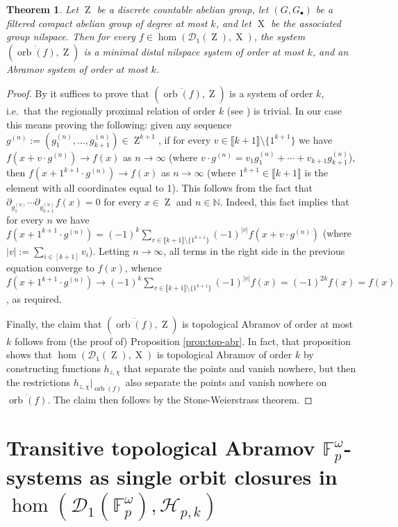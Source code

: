 \documentclass[a4paper,12pt,reqno]{amsart}
\newtheorem{theorem}{Theorem}[section]
\theoremstyle{definition}
\newcommand{\mc}{\mathcal}
\newcommand{\mb}{\mathbb}
\DeclareMathOperator{\ab}{Z}
\DeclareMathOperator{\ns}{X}
\DeclareMathOperator{\orb}{orb}
\newcommand*{\db}[1]{\llbracket #1\rrbracket}
\begin{document}
\begin{theorem}\label{thm:poly-gen-min-dis-ilspace-systems}
Let $\ab$ be a discrete countable abelian group, let $(G,G_\bullet)$ be a filtered compact abelian group of degree at most $k$, and let $\ns$ be the associated group nilspace. Then for every $f\in \hom(\mc{D}_1(\ab),\ns)$, the system $(\overline{\orb(f)},\ab)$ is a minimal distal nilspace system of order at most $k$, and an Abramov system of order at most $k$.
\end{theorem}

\begin{proof}
By \cite[Theorem 7.14]{GGY} it suffices to prove that $(\overline{\orb(f)},\ab)$ is a system of order $k$, i.e.\ that the regionally proximal relation of order $k$ (see \cite{Song-Ye}) is trivial. In our case this means proving the following: given any sequence $g^{(n)}:=(g_1^{(n)},\ldots,g_{k+1}^{(n)}) \in \ab^{k+1}$, if for every $v\in \db{k+1}\setminus\{1^{k+1}\}$ we have $f(x+v\cdot g^{(n)})\to f(x)$ as $n\to \infty$ (where $v\cdot g^{(n)}=v_1g^{(n)}_1+\cdots+v_{k+1}g^{(n)}_{k+1}$), then $f(x+1^{k+1}\cdot g^{(n)})\to f(x)$ as $n\to\infty$ (where $1^{k+1}\in \db{k+1}$ is the element with all coordinates equal to 1). This follows from the fact that  $\partial_{g_1^{(n)}}\cdots \partial_{g_{k+1}^{(n)}} f(x) = 0$ for every $x\in \ab$ and $n\in \mb{N}$. Indeed, this fact implies that for every $n$ we have $f(x+1^{k+1}\cdot g^{(n)}) = (-1)^k\sum_{v\in \db{k+1}\setminus\{1^{k+1}\}}(-1)^{|v|} f(x+v\cdot g^{(n)})$ (where $|v|:=\sum_{i\in [k+1]}v_i$). Letting $n\to\infty$, all terms in the right side in the previous equation converge to $f(x)$, whence $f(x+1^{k+1}\cdot g^{(n)}) \to   (-1)^k \sum_{v\in \db{k+1}\setminus\{1^{k+1}\}} (-1)^{|v|}f(x) = (-1)^{2k}f(x)=f(x)$, as required. 

Finally, the claim that $(\overline{\orb(f)},\ab)$ is topological Abramov of order at most $k$ follows from (the proof of) Proposition \ref{prop:top-abr}. In fact, that proposition shows that $\hom(\mc{D}_1(\ab),\ns)$ is topological Abramov of order $k$ by constructing  functions $h_{z,\chi}$ that separate the points and vanish nowhere, but then the restrictions $h_{z,\chi}|_{\overline{\orb(f)}}$ also separate the points and vanish nowhere on $\overline{\orb(f)}$. The claim then follows by the Stone-Weierstrass theorem.
\end{proof}

\section{\texorpdfstring{Transitive topological Abramov $\mb{F}_p^\omega$-systems as  single orbit closures in $\hom(\mc{D}_1(\mb{F}_p^\omega),\mc{H}_{p,k})$}{Transitive topological Abramov Fp⍵-systems as single orbit closures in hom(D1(Fp⍵),$H_{p,k})$}
}\label{sec:CharSec}
\end{document}
